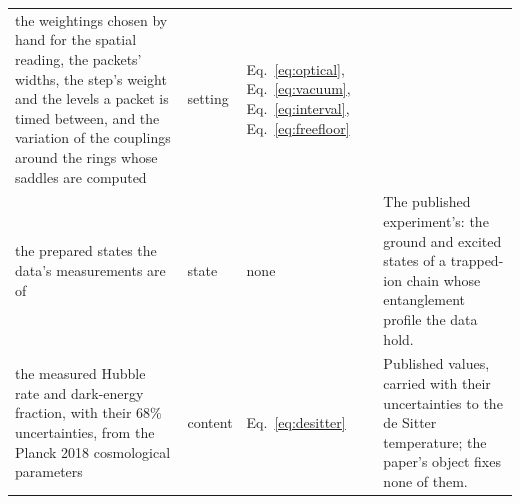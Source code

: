 \begin{tabular}{p{2.3in}lp{1.2in}p{2.3in}}
\raggedright the weightings chosen by hand for the spatial reading, the packets' widths, the step's weight and the levels a packet is timed between, and the variation of the couplings around the rings whose saddles are computed & setting & \raggedright Eq.~\eqref{eq:optical}, Eq.~\eqref{eq:vacuum}, Eq.~\eqref{eq:interval}, Eq.~\eqref{eq:freefloor} & \raggedright  \tabularnewline
\raggedright the prepared states the data's measurements are of & state & \raggedright none & \raggedright The published experiment's: the ground and excited states of a trapped-ion chain whose entanglement profile the data hold. \tabularnewline
\raggedright the measured Hubble rate and dark-energy fraction, with their 68\% uncertainties, from the Planck 2018 cosmological parameters & content & \raggedright Eq.~\eqref{eq:desitter} & \raggedright Published values, carried with their uncertainties to the de Sitter temperature; the paper's object fixes none of them. \tabularnewline
\bottomrule
\end{tabular}
